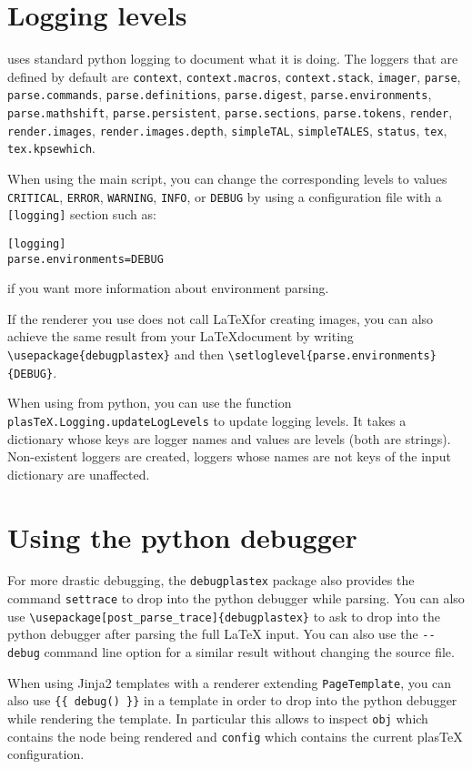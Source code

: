 \section{Logging levels}
\label{sec:logging-levels}

\plasTeX uses standard python logging to document what it is doing. The
loggers that are defined by default are
\verb+context+,
\verb+context.macros+,
\verb+context.stack+,
\verb+imager+,
\verb+parse+,
\verb+parse.commands+,
\verb+parse.definitions+,
\verb+parse.digest+,
\verb+parse.environments+,
\verb+parse.mathshift+,
\verb+parse.persistent+,
\verb+parse.sections+,
\verb+parse.tokens+,
\verb+render+,
\verb+render.images+,
\verb+render.images.depth+,
\verb+simpleTAL+,
\verb+simpleTALES+,
\verb+status+,
\verb+tex+,
\verb+tex.kpsewhich+.

When using the main  script, you can change the
corresponding levels to values \verb+CRITICAL+, \verb+ERROR+,
\verb+WARNING+, \verb+INFO+, or \verb+DEBUG+ by using a configuration
file with a \verb+[logging]+ section such as:
\begin{verbatim}
[logging]
parse.environments=DEBUG
\end{verbatim}
if you want more information about environment parsing.

If the renderer you use does not call \LaTeX for creating images, you
can also achieve the same result from your \LaTeX document
by writing \verb+\usepackage{debugplastex}+ and then
\verb+\setloglevel{parse.environments}{DEBUG}+.

When using \plasTeX from python, you can use the function
\verb+plasTeX.Logging.updateLogLevels+ to update logging levels. It takes
a dictionary whose keys are logger names and values are levels (both are
strings). Non-existent loggers are created, loggers whose names are not
keys of the input dictionary are unaffected.


\section{Using the python debugger}

For more drastic debugging, the \verb+debugplastex+ package also
provides the command \verb+settrace+ to drop into the python debugger
while parsing. You can also use
\verb+\usepackage[post_parse_trace]{debugplastex}+ to ask \plasTeX
to drop into the python debugger after parsing the full LaTeX input.
You can also use the \verb+--debug+ command line option for a similar result
without changing the source file.

When using Jinja2 templates with a renderer extending
\verb+PageTemplate+, you can also use \verb+{{ debug() }}+ in a template in
order to drop into the python debugger while rendering the template. In
particular this allows to inspect \verb+obj+ which contains
the node being rendered and \verb+config+ which contains the current
plasTeX configuration.
